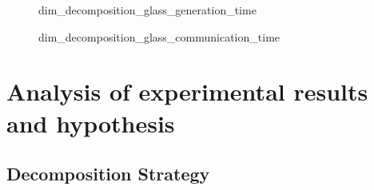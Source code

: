 \documentclass[conference,compsoc]{IEEEtran}
\begin{document}
\begin{figure}[htbp]%
	\centering
	\caption{dim\_decomposition\_glass\_generation\_time}
\end{figure}

\begin{figure}[htbp]%
	\centering
	\caption{dim\_decomposition\_glass\_communication\_time}
\end{figure}
\section{Analysis of experimental results and hypothesis}
\subsection{Decomposition Strategy}
\end{document}
